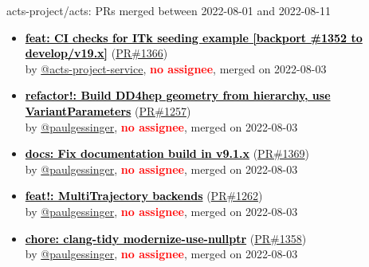 \begin{frame}[allowframebreaks]{ acts-project/acts: PRs merged 
between 2022-08-01 and 2022-08-11
}
\begin{itemize}
    \item\prmerged
    \hspace*{0.1em}
    \textbf{\href{https://github.com/acts-project/acts/pull/1366}{\textcolor{black}{feat: CI checks for ITk seeding example [backport \#1352 to develop/v19.x]}}}
    (\href{https://github.com/acts-project/acts/pull/1366}{PR\#1366}) \\
    by \href{https://github.com/acts-project-service}{@acts-project-service}, {}\textbf{\textcolor{Red}{no assignee}}, merged on 2022-08-03

    \item\prmerged
    \hspace*{0.1em}
    \textbf{\href{https://github.com/acts-project/acts/pull/1257}{\textcolor{black}{refactor!: Build DD4hep geometry from hierarchy, use VariantParameters}}}
    (\href{https://github.com/acts-project/acts/pull/1257}{PR\#1257}) \\
    by \href{https://github.com/paulgessinger}{@paulgessinger}, {}\textbf{\textcolor{Red}{no assignee}}, merged on 2022-08-03

    \item\prmerged
    \hspace*{0.1em}
    \textbf{\href{https://github.com/acts-project/acts/pull/1369}{\textcolor{black}{docs: Fix documentation build in v9.1.x}}}
    (\href{https://github.com/acts-project/acts/pull/1369}{PR\#1369}) \\
    by \href{https://github.com/paulgessinger}{@paulgessinger}, {}\textbf{\textcolor{Red}{no assignee}}, merged on 2022-08-03

    \item\prmerged
    \hspace*{0.1em}
    \textbf{\href{https://github.com/acts-project/acts/pull/1262}{\textcolor{black}{feat!: MultiTrajectory backends}}}
    (\href{https://github.com/acts-project/acts/pull/1262}{PR\#1262}) \\
    by \href{https://github.com/paulgessinger}{@paulgessinger}, {}\textbf{\textcolor{Red}{no assignee}}, merged on 2022-08-03

    \item\prmerged
    \hspace*{0.1em}
    \textbf{\href{https://github.com/acts-project/acts/pull/1358}{\textcolor{black}{chore: clang-tidy modernize-use-nullptr}}}
    (\href{https://github.com/acts-project/acts/pull/1358}{PR\#1358}) \\
    by \href{https://github.com/paulgessinger}{@paulgessinger}, {}\textbf{\textcolor{Red}{no assignee}}, merged on 2022-08-03


\end{itemize}
\end{frame}
